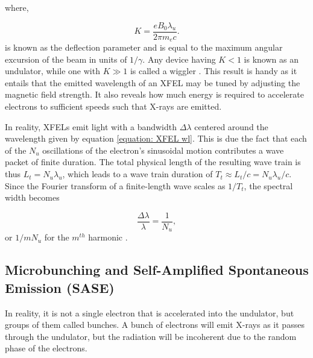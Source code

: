 \documentclass[aps,prb,twocolumn,superscriptaddress]{revtex4-2}
\begin{document}
where,

\begin{equation}
    K = \frac{eB_0\lambda_u}{2\pi m_e c}.
\end{equation}
is known as the deflection parameter and is equal to the maximum angular
excursion of the beam in units of $1/\gamma$. Any device having $K < 1$ is
known as an undulator, while one with $K \gg 1$ is called a wiggler
\cite{CERN}. This result is handy as it
entails that the emitted wavelength of an XFEL may be tuned by adjusting the
magnetic field strength. It also reveals how much 
energy is required to accelerate electrons to sufficient speeds such that 
X-rays are emitted. 
    
    In reality, XFELs emit light with a bandwidth $\Delta\lambda$ centered
around the wavelength given by equation \ref{equation: XFEL wl}. This is due
the fact that each of the $N_u$ oscillations of the electron's sinusoidal motion 
contributes a wave packet of finite duration. The total physical length of the
resulting wave train is thus $L_t = N_u\lambda_u$, which leads to a wave train
duration of $T_t \approx L_t/c = N_u\lambda_u/c$. Since the Fourier transform 
of a finite-length wave scales as $1/T_t$, the spectral width becomes

\begin{equation}
    \frac{\Delta\lambda}{\lambda} = \frac{1}{N_u},
\end{equation}
or $1/mN_u$ for the $m^{th}$ harmonic \cite{CERN}.

\subsection{Microbunching and Self-Amplified Spontaneous Emission (SASE)}

In reality, it is not a single electron that is accelerated into the undulator,
but groups of them called bunches. A bunch of electrons will emit X-rays as it
passes through the undulator, but the radiation will be incoherent due to the
random phase of the electrons. 
\end{document}

